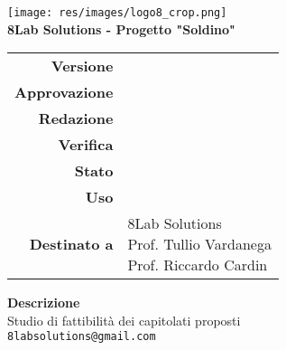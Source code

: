 \thispagestyle{empty}
\begin{titlepage}
	\begin{center}
		\texttt{[image: res/images/logo8\_crop.png]}\\
		\large \textbf{8Lab Solutions - Progetto "Soldino"} \\
		\vfill
		\Huge \textbf{\doctitle}
		\vspace*{\fill}
        
        \vfill
        \large
        \begin{tabular}{r|l}
                        \textbf{Versione} & \rev{} \\
                        \textbf{Approvazione} & \approv{} \\
                        \textbf{Redazione} & \red{} \\
                        \textbf{Verifica} & \ver{} \\
                        \textbf{Stato} & \stato{} \\
                        \textbf{Uso} & \uso{} \\
                        \textbf{Destinato a} & \parbox[t]{5cm}{8Lab Solutions
                        \\Prof. Tullio Vardanega\\Prof. Riccardo Cardin}
                \end{tabular}
                \vfill
                \normalsize
                \textbf{Descrizione}\\
                Studio di fattibilità dei capitolati proposti\\
                \vfill
                \small
                \texttt{8labsolutions@gmail.com}
	\end{center}
\end{titlepage}